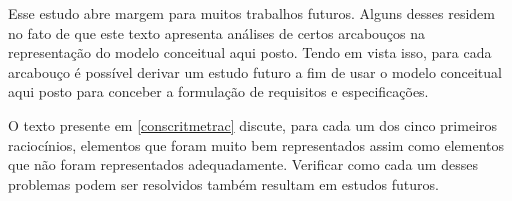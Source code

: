 Esse estudo abre margem para muitos trabalhos futuros. Alguns desses residem no fato de que este texto apresenta análises de certos arcabouços na representação do modelo conceitual aqui posto. Tendo em vista isso, para cada arcabouço é possível derivar um estudo futuro a fim de usar o modelo conceitual aqui posto para conceber a formulação de requisitos e especificações. 

O texto presente em \ref{conscritmetrac} discute, para cada um dos cinco primeiros raciocínios, elementos que foram muito bem representados assim como elementos que não foram representados adequadamente. Verificar como cada um desses problemas podem ser resolvidos também resultam em estudos futuros. 